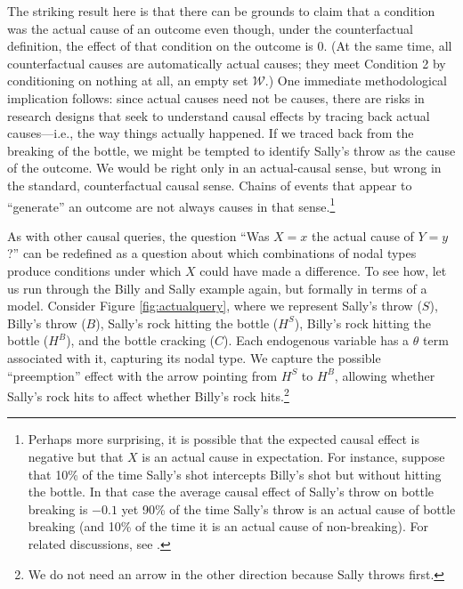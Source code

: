\documentclass[
  12pt,
]{book}
\begin{document}
The striking result here is that there can be grounds to claim that a condition was the actual cause of an outcome even though, under the counterfactual definition, the effect of that condition on the outcome is 0. (At the same time, all counterfactual causes are automatically actual causes; they meet Condition 2 by conditioning on nothing at all, an empty set \(\mathcal W\).) One immediate methodological implication follows: since actual causes need not be causes, there are risks in research designs that seek to understand causal effects by tracing back actual causes---i.e., the way things actually happened. If we traced back from the breaking of the bottle, we might be tempted to identify Sally's throw as the cause of the outcome. We would be right only in an actual-causal sense, but wrong in the standard, counterfactual causal sense. Chains of events that appear to ``generate'' an outcome are not always causes in that sense.\footnote{Perhaps more surprising, it is possible that the expected causal effect is negative but that \(X\) is an actual cause in expectation. For instance, suppose that 10\% of the time Sally's shot intercepts Billy's shot but without hitting the bottle. In that case the average causal effect of Sally's throw on bottle breaking is \(-0.1\) yet 90\% of the time Sally's throw is an actual cause of bottle breaking (and 10\% of the time it is an actual cause of non-breaking). For related discussions, see \citet{menzies1989probabilistic}.}

As with other causal queries, the question ``Was \(X=x\) the actual cause of \(Y=y\)?'' can be redefined as a question about which combinations of nodal types produce conditions under which \(X\) could have made a difference. To see how, let us run through the Billy and Sally example again, but formally in terms of a model. Consider Figure \ref{fig:actualquery}, where we represent Sally's throw (\(S\)), Billy's throw (\(B\)), Sally's rock hitting the bottle (\(H^S\)), Billy's rock hitting the bottle (\(H^B\)), and the bottle cracking (\(C\)). Each endogenous variable has a \(\theta\) term associated with it, capturing its nodal type. We capture the possible ``preemption'' effect with the arrow pointing from \(H^S\) to \(H^B\), allowing whether Sally's rock hits to affect whether Billy's rock hits.\footnote{We do not need an arrow in the other direction because Sally throws first.}
\end{document}
